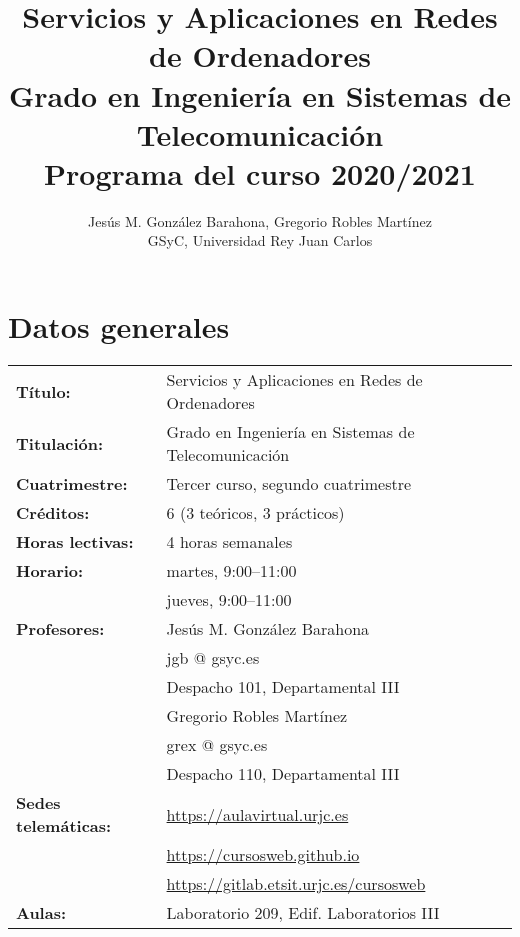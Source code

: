 \documentclass[a4paper,12pt]{article}
\title{Servicios y Aplicaciones en Redes de Ordenadores \\
Grado en Ingeniería en Sistemas de Telecomunicación \\
Programa del curso 2020/2021}
\author{Jesús M. González Barahona, Gregorio Robles Martínez \\
GSyC, Universidad Rey Juan Carlos}
\begin{document}
\maketitle

\tableofcontents

\newpage

\section{Datos generales}

\begin{tabular}{ll}
\textbf{Título:} & Servicios y Aplicaciones en Redes de Ordenadores  \\
\textbf{Titulación:} & Grado en Ingeniería en Sistemas de Telecomunicación \\
\textbf{Cuatrimestre:} & Tercer curso, segundo cuatrimestre \\
\textbf{Créditos:} & 6 (3 teóricos, 3 prácticos) \\
\textbf{Horas lectivas:} & 4 horas semanales \\
\textbf{Horario:} & martes, 9:00--11:00 \\
                  & jueves, 9:00--11:00 \\
\textbf{Profesores:}
& Jesús M. González Barahona \\
& \hspace{1cm}jgb @ gsyc.es \\
& \hspace{1cm}Despacho 101, Departamental III\\
& Gregorio Robles Martínez\\
& \hspace{1cm}grex @ gsyc.es \\
& \hspace{1cm}Despacho 110, Departamental III\\
\textbf{Sedes telemáticas:} & \url{https://aulavirtual.urjc.es} \\
                            & \url{https://cursosweb.github.io} \\
                            & \url{https://gitlab.etsit.urjc.es/cursosweb} \\
\textbf{Aulas:} & Laboratorio 209, Edif. Laboratorios III
\end{tabular}
\end{document}
